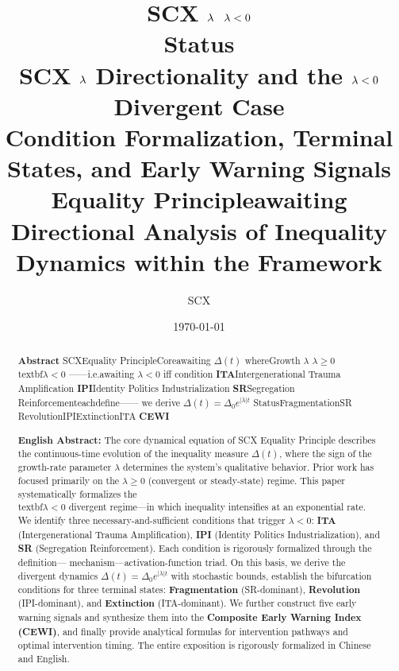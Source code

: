 \documentclass[11pt,a4paper]{article}
\title{
    {\Huge \textbf{SCX $\lambdaparam$  $\lambdaparam < 0$ }}\\[0.3cm]
    {\Large \textbf{Status}}\\[0.3cm]
    {\Large SCX $\lambdaparam$ Directionality and the $\lambdaparam < 0$ Divergent Case}\\[0.2cm]
    {\large Condition Formalization, Terminal States, and Early Warning Signals}\\[0.3cm]
    {\normalsize Equality Principleawaiting}\\
    {\normalsize Directional Analysis of Inequality Dynamics within the \eqtheory{} Framework}
}
\author{SCX}
\date{\today}
\theoremstyle{remark}
\newcommand{\eqtheory}{Equality Principle}
\newcommand{\ineq}{\Delta}
\newcommand{\lambdaparam}{\lambda}
\begin{document}
\maketitle

\begin{abstract}
\noindent
\textbf{Abstract}
SCXEquality PrincipleCoreawaiting $\ineq(t)$ whereGrowth
$\lambdaparam$  $\lambdaparam \geq 0$
\\textbf{$\lambdaparam < 0$ }——i.e.awaiting
 $\lambdaparam < 0$ iff condition
\textbf{ITA}Intergenerational Trauma Amplification
\textbf{IPI}Identity Politics Industrialization
\textbf{SR}Segregation Reinforcementeachdefine——
we derive $\ineq(t) = \ineq_0 e^{|\lambdaparam| t}$
Status\textbf{}FragmentationSR
\textbf{}RevolutionIPI\textbf{}ExtinctionITA
\textbf{CEWI}


\vspace{0.3cm}
\noindent
\textbf{English Abstract:}
The core dynamical equation of SCX \eqtheory{} describes the continuous-time evolution
of the inequality measure $\ineq(t)$, where the sign of the growth-rate parameter
$\lambdaparam$ determines the system's qualitative behavior. Prior work has focused
primarily on the $\lambdaparam \geq 0$ (convergent or steady-state) regime. This paper
systematically formalizes the \\textbf{$\lambdaparam < 0$ divergent regime}—in which inequality
intensifies at an exponential rate. We identify three necessary-and-sufficient conditions
that trigger $\lambdaparam < 0$: \textbf{ITA} (Intergenerational Trauma Amplification),
\textbf{IPI} (Identity Politics Industrialization), and \textbf{SR} (Segregation
Reinforcement). Each condition is rigorously formalized through the definition—
mechanism—activation-function triad. On this basis, we derive the divergent dynamics
$\ineq(t) = \ineq_0 e^{|\lambdaparam| t}$ with stochastic bounds, establish the
bifurcation conditions for three terminal states: \textbf{Fragmentation}
(SR-dominant), \textbf{Revolution} (IPI-dominant), and \textbf{Extinction}
(ITA-dominant). We further construct five early warning signals and synthesize them
into the \textbf{Composite Early Warning Index (CEWI)}, and finally provide
analytical formulas for intervention pathways and optimal intervention timing.
The entire exposition is rigorously formalized in Chinese and English.
\end{abstract}
\end{document}
